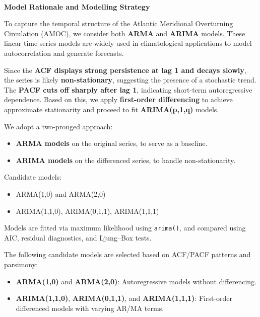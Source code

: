 \documentclass[
  11pt,
]{article}
\makeatletter
\let\oldparagraph\paragraph
\renewcommand{\paragraph}{
    \@ifstar
      \xxxParagraphStar
      \xxxParagraphNoStar
  }
\newcommand{\xxxParagraphStar}[1]{\oldparagraph*{#1}\mbox{}}
\newcommand{\xxxParagraphNoStar}[1]{\oldparagraph{#1}\mbox{}}
\makeatother
\begin{document}
\paragraph{\texorpdfstring{\textbf{Model Rationale and Modelling
Strategy}}{Model Rationale and Modelling Strategy}}\label{model-rationale-and-modelling-strategy}

To capture the temporal structure of the Atlantic Meridional Overturning
Circulation (AMOC), we consider both \textbf{ARMA} and \textbf{ARIMA}
models. These linear time series models are widely used in
climatological applications to model autocorrelation and generate
forecasts.

Since the \textbf{ACF displays strong persistence at lag 1 and decays
slowly}, the series is likely \textbf{non-stationary}, suggesting the
presence of a stochastic trend. The \textbf{PACF cuts off sharply after
lag 1}, indicating short-term autoregressive dependence. Based on this,
we apply \textbf{first-order differencing} to achieve approximate
stationarity and proceed to fit \textbf{ARIMA(p,1,q)} models.

We adopt a two-pronged approach:

\begin{itemize}
\item
  \textbf{ARMA models} on the original series, to serve as a baseline.
\item
  \textbf{ARIMA models} on the differenced series, to handle
  non-stationarity.
\end{itemize}

Candidate models:

\begin{itemize}
\item
  ARMA(1,0) and ARMA(2,0)
\item
  ARIMA(1,1,0), ARIMA(0,1,1), ARIMA(1,1,1)
\end{itemize}

Models are fitted via maximum likelihood using \texttt{arima()}, and
compared using AIC, residual diagnostics, and Ljung--Box tests.

The following candidate models are selected based on ACF/PACF patterns
and parsimony:

\begin{itemize}
\item
  \textbf{ARMA(1,0)} and \textbf{ARMA(2,0)}: Autoregressive models
  without differencing.
\item
  \textbf{ARIMA(1,1,0)}, \textbf{ARIMA(0,1,1)}, and
  \textbf{ARIMA(1,1,1)}: First-order differenced models with varying
  AR/MA terms.
\end{itemize}
\end{document}
